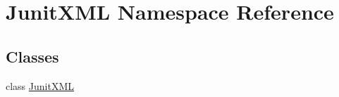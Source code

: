 \hypertarget{namespaceJunitXML}{\section{Junit\-X\-M\-L Namespace Reference}
\label{namespaceJunitXML}
}
\subsection*{Classes}
\begin{DoxyCompactItemize}
\item 
class \hyperlink{classJunitXML_1_1JunitXML}{Junit\-X\-M\-L}
\end{DoxyCompactItemize}
